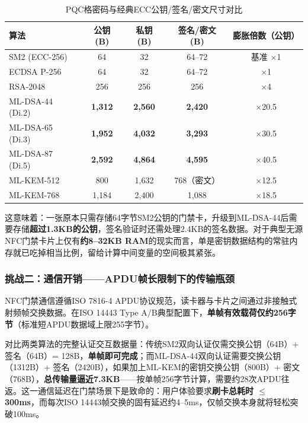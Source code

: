 \begin{table}[htbp]
	\centering
	\caption{PQC格密码与经典ECC公钥/签名/密文尺寸对比}
	\label{tab:size_comparison}
	\renewcommand{\arraystretch}{1.3}
	\small
	\begin{tabular}{lcccc}
		\toprule
		\textbf{算法} & \textbf{公钥 (B)} & \textbf{私钥 (B)} & \textbf{签名/密文 (B)} & \textbf{膨胀倍数（公钥）} \\
		\midrule
		SM2 (ECC-256)         & 64    & 32    & 64--72  & 基准 $\times$1 \\
		ECDSA P-256           & 64    & 32    & 64--72  & $\times$1 \\
		RSA-2048              & 256   & 256   & 256     & $\times$4 \\
		\midrule
		ML-DSA-44 (Di.2)      & \textbf{1,312} & \textbf{2,560} & \textbf{2,420} & $\times$20.5 \\
		ML-DSA-65 (Di.3)      & \textbf{1,952} & \textbf{4,032} & \textbf{3,293} & $\times$30.5 \\
		ML-DSA-87 (Di.5)      & \textbf{2,592} & \textbf{4,864} & \textbf{4,595} & $\times$40.5 \\
		ML-KEM-512            & 800   & 1,632 & 768（密文） & $\times$12.5 \\
		ML-KEM-768            & 1,184 & 2,400 & 1,088     & $\times$18.5 \\
		\bottomrule
	\end{tabular}
\end{table}

这意味着：一张原本只需存储64字节SM2公钥的门禁卡，升级到ML-DSA-44后需要存储\textbf{超过1.3KB的公钥}，签名验证时还需处理2.4KB的签名数据。对于典型无源NFC门禁卡片上仅有\textbf{约8--32KB RAM}的现实而言，单是密钥数据结构的常驻内存就已吃掉相当比例，留给计算中间变量的空间极其紧张。

\subsubsection{挑战二：通信开销——APDU帧长限制下的传输瓶颈}

NFC门禁通信遵循ISO 7816-4 APDU协议规范，读卡器与卡片之间通过非接触式射频帧交换数据。在ISO 14443 Type A/B典型配置下，\textbf{单帧有效载荷仅约256字节}（标准短APDU数据域上限255字节）。

对比两类算法的完整认证交互数据量：传统SM2双向认证仅需交换公钥（64B）+ 签名（64B）= 128B，\textbf{单帧即可完成}；而ML-DSA-44双向认证需要交换公钥（1312B）+ 签名（2420B），如果加上ML-KEM的密钥交换公钥（800B）+ 密文（768B），\textbf{总传输量逼近7.3KB}——按单帧256字节计算，需要约28次APDU往返。这一通信延迟在门禁场景下是致命的：用户体验要求\textbf{刷卡总耗时 $\le$ 300ms}，而每次ISO 14443帧交换的固有延迟约4--5ms，仅帧交换本身就将轻松突破100ms。

